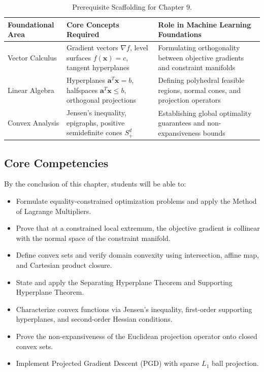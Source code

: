 \begin{table}[htbp]
\centering
\small
\begin{tabularx}{\textwidth}{lXX}
\toprule
\textbf{Foundational Area} & \textbf{Core Concepts Required} & \textbf{Role in Machine Learning Foundations} \\
\midrule
Vector Calculus & Gradient vectors $\nabla f$, level surfaces $f(\mathbf{x}) = c$, tangent hyperplanes & Formulating orthogonality between objective gradients and constraint manifolds \\
\addlinespace
Linear Algebra & Hyperplanes $\mathbf{a}^T \mathbf{x} = b$, halfspaces $\mathbf{a}^T \mathbf{x} \le b$, orthogonal projections & Defining polyhedral feasible regions, normal cones, and projection operators \\
\addlinespace
Convex Analysis & Jensen's inequality, epigraphs, positive semidefinite cones $S^d_+$ & Establishing global optimality guarantees and non-expansiveness bounds \\
\bottomrule
\end{tabularx}
\caption{Prerequisite Scaffolding for Chapter 9.}
\label{tab:w09_prereqs}
\end{table}

\subsection{Core Competencies}
By the conclusion of this chapter, students will be able to:
\begin{itemize}
    \item Formulate equality-constrained optimization problems and apply the Method of Lagrange Multipliers.
    \item Prove that at a constrained local extremum, the objective gradient is collinear with the normal space of the constraint manifold.
    \item Define convex sets and verify domain convexity using intersection, affine map, and Cartesian product closure.
    \item State and apply the Separating Hyperplane Theorem and Supporting Hyperplane Theorem.
    \item Characterize convex functions via Jensen's inequality, first-order supporting hyperplanes, and second-order Hessian conditions.
    \item Prove the non-expansiveness of the Euclidean projection operator onto closed convex sets.
    \item Implement Projected Gradient Descent (PGD) with sparse $L_1$ ball projection.
\end{itemize}

